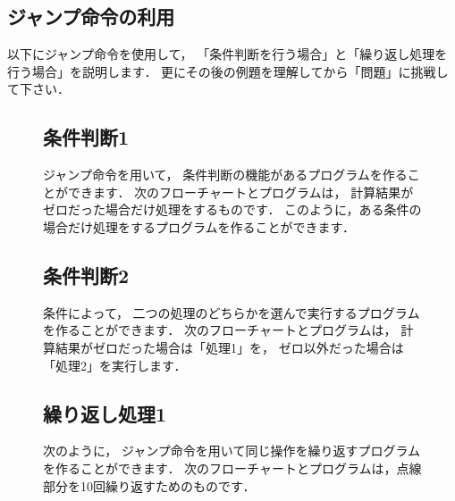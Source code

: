 \subsection{ジャンプ命令の利用}

以下にジャンプ命令を使用して，
「条件判断を行う場合」と「繰り返し処理を行う場合」を説明します．
更にその後の例題を理解してから「問題」に挑戦して下さい．

\begin{figure}[btp]
\begin{framed}
\subsection*{条件判断1}
ジャンプ命令を用いて，
条件判断の機能があるプログラムを作ることができます．
次のフローチャートとプログラムは，
計算結果がゼロだった場合だけ処理をするものです．
このように，ある条件の場合だけ処理をするプログラムを作ることができます．

\begin{center}
\end{center}
\end{framed}
\end{figure}

\begin{figure}[btp]
\begin{framed}
\subsection*{条件判断2}
条件によって，
二つの処理のどちらかを選んで実行するプログラムを作ることができます．
次のフローチャートとプログラムは，
計算結果がゼロだった場合は「処理1」を，
ゼロ以外だった場合は「処理2」を実行します．

\begin{center}
\end{center}
\end{framed}
\end{figure}

\begin{figure}[btp]
\begin{framed}
\subsection*{繰り返し処理1}
次のように，
ジャンプ命令を用いて同じ操作を繰り返すプログラムを作ることができます．
次のフローチャートとプログラムは，点線部分を10回繰り返すためのものです．

\begin{center}
\end{center}
\end{framed}
\end{figure}

